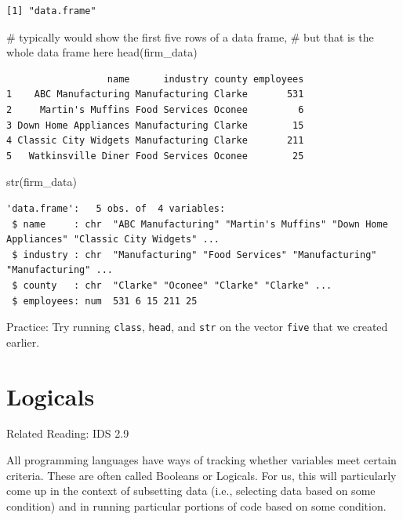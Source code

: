 \documentclass[
  letterpaper,
  DIV=11,
  numbers=noendperiod]{scrreprt}
\newenvironment{Shaded}{\begin{snugshade}}{\end{snugshade}}
\newcommand{\CommentTok}[1]{\textcolor[rgb]{0.37,0.37,0.37}{#1}}
\newcommand{\FunctionTok}[1]{\textcolor[rgb]{0.28,0.35,0.67}{#1}}
\newcommand{\NormalTok}[1]{\textcolor[rgb]{0.00,0.23,0.31}{#1}}
\begin{document}
\begin{verbatim}
[1] "data.frame"
\end{verbatim}

\begin{Shaded}
\begin{Highlighting}[]
\CommentTok{\# typically would show the first five rows of a data frame,}
\CommentTok{\# but that is the whole data frame here}
\FunctionTok{head}\NormalTok{(firm\_data) }
\end{Highlighting}
\end{Shaded}

\begin{verbatim}
                  name      industry county employees
1    ABC Manufacturing Manufacturing Clarke       531
2     Martin's Muffins Food Services Oconee         6
3 Down Home Appliances Manufacturing Clarke        15
4 Classic City Widgets Manufacturing Clarke       211
5   Watkinsville Diner Food Services Oconee        25
\end{verbatim}

\begin{Shaded}
\begin{Highlighting}[]
\FunctionTok{str}\NormalTok{(firm\_data)}
\end{Highlighting}
\end{Shaded}

\begin{verbatim}
'data.frame':   5 obs. of  4 variables:
 $ name     : chr  "ABC Manufacturing" "Martin's Muffins" "Down Home Appliances" "Classic City Widgets" ...
 $ industry : chr  "Manufacturing" "Food Services" "Manufacturing" "Manufacturing" ...
 $ county   : chr  "Clarke" "Oconee" "Clarke" "Clarke" ...
 $ employees: num  531 6 15 211 25
\end{verbatim}

{Practice:} Try running \texttt{class}, \texttt{head}, and \texttt{str}
on the vector \texttt{five} that we created earlier.

\section{Logicals}\label{logicals}

Related Reading: IDS 2.9

All programming languages have ways of tracking whether variables meet
certain criteria. These are often called Booleans or Logicals. For us,
this will particularly come up in the context of subsetting data (i.e.,
selecting data based on some condition) and in running particular
portions of code based on some condition.
\end{document}
